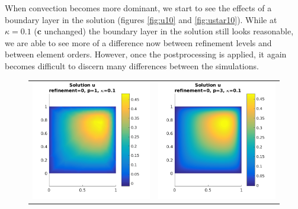 \documentclass{article}
\begin{document}
When convection becomes more dominant, we start to see the effects of a boundary layer in the solution (figures \ref{fig:u10} and \ref{fig:ustar10}).
While at $\kappa = 0.1$ ($\mathbf{c}$ unchanged) the boundary layer in the solution still looks reasonable, we are able to see more of a difference now between refinement levels and between element orders.
However, once the postprocessing is applied, it again becomes difficult to discern many differences between the simulations.

\begin{figure}[!ht]
\centering
\begin{tabular}{c c}
\includegraphics[scale=0.7]{umu_112.png} & 
\includegraphics[scale=0.7]{umu_212.png} \\

\end{tabular}
\end{figure}
\end{document}
